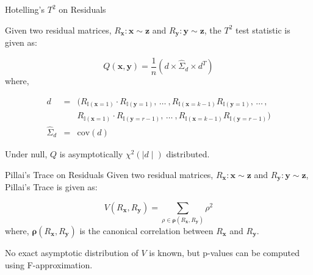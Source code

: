 \documentclass{beamer}
\begin{document}
\begin{frame}{Hotelling's $ T^2 $ on Residuals}

Given two residual matrices, $ R_{\mathbf{x}}: \mathbf{x} \sim \mathbf{z} $ and $ R_{\mathbf{y}}: \mathbf{y} \sim \mathbf{z} $, the $ T^2 $ test statistic is given as:

\begin{equation}
	Q(\mathbf{x}, \mathbf{y}) = \frac{1}{n} \left( d \times \hat{\Sigma}_d \times d^T \right)
\end{equation}
where,

\begin{eqnarray*}
d &  =  & (R_{\mathbb{I}(\mathbf{x}=1)} \cdot R_{\mathbb{I}(\mathbf{y}=1)}, \, \ldots \ ,
R_{\mathbb{I}(\mathbf{x}=k-1)} R_{\mathbb{I}(\mathbf{y}=1)}, \, \ldots \, ,
\\
 &  & R_{\mathbb{I}(\mathbf{x}=1)} \cdot R_{\mathbb{I}(\mathbf{y}=r-1)}, \, \ldots \ ,
R_{\mathbb{I}(\mathbf{x}=k-1)} R_{\mathbb{I}(\mathbf{y}=r-1)}
) \\
\hat{\Sigma}_d & = &\textrm{cov}(d)
\end{eqnarray*}



Under null, $ Q $ is asymptotically $ \chi^2 (\mid d \mid) $ distributed.

\end{frame}

\begin{frame}{Pillai's Trace on Residuals}
Given two residual matrices, $ R_{\mathbf{x}}: \mathbf{x} \sim \mathbf{z} $ and $ R_{\mathbf{y}}: \mathbf{y} \sim \mathbf{z} $, Pillai's Trace is given as:

\begin{equation}
	\textit{V}(R_\mathbf{x}, R_\mathbf{y}) = \sum_{\rho \in \bm{\rho}(R_\mathbf{x}, R_\mathbf{y})} \rho^2
\end{equation}
where, $ \bm{\rho}({R_\mathbf{x}, R_\mathbf{y}}) $  is the canonical correlation between $ R_\mathbf{x} $ and $ R_\mathbf{y} $.

\vspace{1em}

No exact asymptotic distribution of $ V $ is known, but p-values can be computed using F-approximation. \footnotemark

\end{frame}
\end{document}
